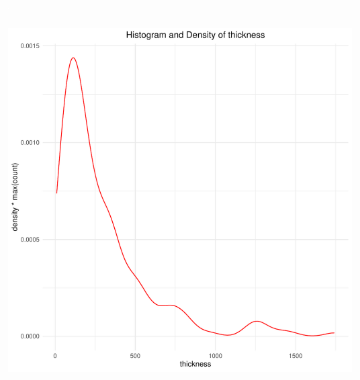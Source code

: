 \begin{enumerate}
\begin{figure}[h]
    \centering
    \begin{subfigure}[b]{0.49\textwidth}
    \includegraphics[width=\textwidth]{Basses_kode/Billeder_duration/Boxplot_of_ thickness .pdf}
    \end{subfigure}
    \begin{subfigure}[b]{0.49\textwidth}
    \includegraphics[width=\textwidth]{Basses_kode/Billeder_duration/Histogram_and_Density_of_ thickness .pdf}

\end{subfigure}
\end{figure}
\end{enumerate}
